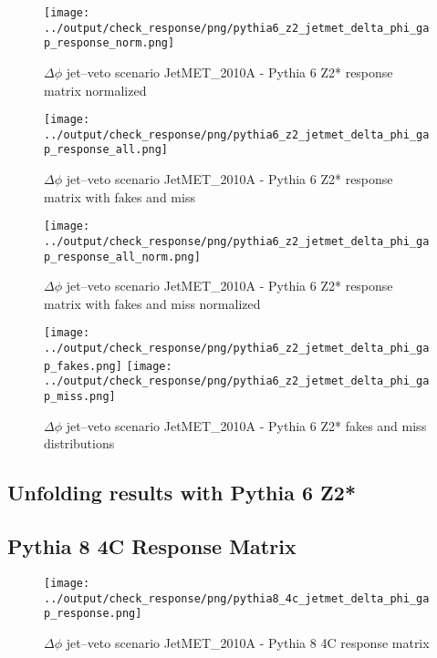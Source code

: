 \documentclass[11pt]{book}
\begin{document}
\begin{figure}[ht]
\centering
\texttt{[image: ../output/check\_response/png/pythia6\_z2\_jetmet\_delta\_phi\_gap\_response\_norm.png]}
\caption{$\Delta\phi$ jet--veto scenario JetMET\_2010A - Pythia 6 Z2* response matrix normalized}
\label{p6_jetmet_delta_phi_gap_response_norm}
\end{figure}

\begin{figure}[ht]
\centering
\texttt{[image: ../output/check\_response/png/pythia6\_z2\_jetmet\_delta\_phi\_gap\_response\_all.png]}
\caption{$\Delta\phi$ jet--veto scenario JetMET\_2010A - Pythia 6 Z2* response matrix with fakes and miss}
\label{p6_jetmet_delta_phi_gap_response_all}
\end{figure}

\begin{figure}[ht]
\centering
\texttt{[image: ../output/check\_response/png/pythia6\_z2\_jetmet\_delta\_phi\_gap\_response\_all\_norm.png]}
\caption{$\Delta\phi$ jet--veto scenario JetMET\_2010A - Pythia 6 Z2* response matrix with fakes and miss normalized}
\label{p6_jetmet_delta_phi_gap_response_all_norm}
\end{figure}

\begin{figure}[ht]
\centering
\texttt{[image: ../output/check\_response/png/pythia6\_z2\_jetmet\_delta\_phi\_gap\_fakes.png]}
\texttt{[image: ../output/check\_response/png/pythia6\_z2\_jetmet\_delta\_phi\_gap\_miss.png]}
\caption{$\Delta\phi$ jet--veto scenario JetMET\_2010A - Pythia 6 Z2* fakes and miss distributions}
\label{p6_jetmet_delta_phi_gap_fakesmiss}
\end{figure}


\clearpage
\subsection{Unfolding results with Pythia 6 Z2*}


\clearpage
\subsection{Pythia 8 4C Response Matrix}


\begin{figure}[ht]
\centering
\texttt{[image: ../output/check\_response/png/pythia8\_4c\_jetmet\_delta\_phi\_gap\_response.png]}
\caption{$\Delta\phi$ jet--veto scenario JetMET\_2010A - Pythia 8 4C response matrix}
\label{p8_jetmet_delta_phi_gap_response}
\end{figure}
\end{document}
